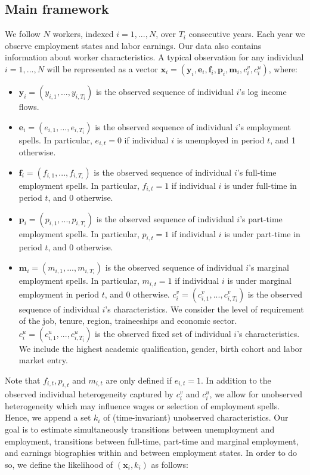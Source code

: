 \documentclass[12pt, a4paper]{article}
\begin{document}
\subsection{Main framework}

We follow $N$ workers, indexed $i=1,...,N$, over $T_i$ consecutive years. Each year we observe employment states and labor earnings. Our data also contains information about worker characteristics. A typical observation for any individual $i=1,...,N$ will be represented as a vector $\textbf{x}_i=(\textbf{y}_i,\textbf{e}_i,\textbf{f}_i,\textbf{p}_i,\textbf{m}_i,c_i^v,c_i^u)$, where:
\vspace{0.2 cm}
\begin{itemize}
\setlength{\itemsep}{0.2 cm}
\item $\textbf{y}_i=(y_{i,1},...,y_{i,T_i})$ is the observed sequence of individual $i$'s log income flows.
\item $\textbf{e}_i=(e_{i,1},...,e_{i,T_i})$ is the observed sequence of individual $i$'s employment spells. In particular, $e_{i,t}=0$ if individual $i$ is unemployed in period $t$, and 1 otherwise.
\item $\textbf{f}_i=(f_{i,1},...,f_{i,T_i})$ is the observed sequence of individual $i$'s full-time employment spells. In particular, $f_{i,t}=1$ if individual $i$ is under full-time in period $t$, and 0 otherwise.
\item $\textbf{p}_i=(p_{i,1},...,p_{i,T_i})$ is the observed sequence of individual $i$'s part-time employment spells. In particular, $p_{i,t}=1$ if individual $i$ is under part-time in period $t$, and 0 otherwise.
\item $\textbf{m}_i=(m_{i,1},...,m_{i,T_i})$ is the observed sequence of individual $i$'s marginal employment spells. In particular, $m_{i,t}=1$ if individual $i$ is under marginal employment in period $t$, and 0 otherwise.
$c_i^v=(c_{i,1}^v,...,c_{i,T_i}^v)$ is the observed sequence of individual $i$'s characteristics. We consider the level of requirement of the job, tenure, region, traineeships and economic sector.
$c_i^{u}=(c_{i,1}^u,...,c_{i,T_i}^u)$ is the observed fixed set of individual $i$'s characteristics. We include the highest academic qualification, gender, birth cohort and labor market entry.
\end{itemize}
\vspace{0.2 cm}

Note that $f_{i,t}, p_{i,t}$ and $m_{i,t}$ are only defined if $e_{i,t}=1$. In addition to the observed individual heterogeneity captured by $c_i^v$ and $c_i^{u}$, we allow for unobserved heterogeneity which may influence wages or selection of employment spells. Hence, we append a set $k_i$ of (time-invariant) unobserved characteristics. Our goal is to estimate simultaneously transitions between unemployment and employment, transitions between full-time, part-time and marginal employment, and earnings biographies within and between employment states. In order to do so, we define the likelihood of $(\textbf{x}_i,k_i)$ as follows:
\end{document}
